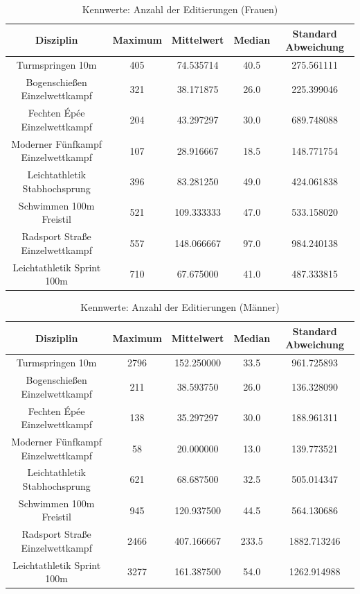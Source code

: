 \documentclass[11pt]{article}
\begin{document}
\begin{table}
\caption{\label{tab:editcount_kpi_women}Kennwerte: Anzahl der Editierungen (Frauen)}
\centering
\begin{tabular}{ c|c|c|c|c }
  Disziplin & Maximum & Mittelwert & Median & Standard Abweichung \\
  \hline
  Turmspringen 10m & 405 & 74.535714 & 40.5 & 275.561111 \\
  Bogenschießen Einzelwettkampf & 321 & 38.171875 & 26.0 & 225.399046 \\
  Fechten Épée Einzelwettkampf & 204 & 43.297297 & 30.0 & 689.748088 \\
  Moderner Fünfkampf Einzelwettkampf & 107 & 28.916667 & 18.5 & 148.771754 \\
  Leichtathletik Stabhochsprung & 396 & 83.281250 & 49.0 & 424.061838\\
  Schwimmen 100m Freistil & 521 & 109.333333 & 47.0 & 533.158020\\
  Radsport Straße Einzelwettkampf & 557 & 148.066667 & 97.0 & 984.240138\\
  Leichtathletik Sprint 100m & 710 & 67.675000 & 41.0 & 487.333815\\
\end{tabular}
\end{table}

\begin{table}
\caption{\label{tab:editcount_kpi_men}Kennwerte: Anzahl der Editierungen (Männer)}
\centering
\begin{tabular}{ c|c|c|c|c }
  Disziplin & Maximum & Mittelwert & Median & Standard Abweichung \\
  \hline
  Turmspringen 10m & 2796 & 152.250000 & 33.5 & 961.725893 \\
  Bogenschießen Einzelwettkampf & 211 & 38.593750 & 26.0 & 136.328090\\
  Fechten Épée Einzelwettkampf & 138 & 35.297297 & 30.0 & 188.961311 \\
  Moderner Fünfkampf Einzelwettkampf & 58 & 20.000000 & 13.0 & 139.773521\\
  Leichtathletik Stabhochsprung & 621 & 68.687500 & 32.5 & 505.014347\\
  Schwimmen 100m Freistil & 945 & 120.937500 & 44.5 & 564.130686\\
  Radsport Straße Einzelwettkampf & 2466 & 407.166667 & 233.5 & 1882.713246\\
  Leichtathletik Sprint 100m & 3277 & 161.387500 & 54.0 & 1262.914988\\
\end{tabular}
\end{table}
\end{document}
